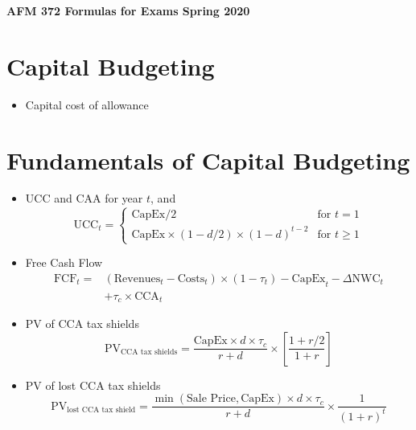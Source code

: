 \documentclass[a4paper,10pt]{extarticle}
\begin{document}
\begin{center}
    \large\bfseries AFM 372 \qquad Formulas for Exams \qquad Spring 2020
\end{center}
\section*{Capital Budgeting}
\begin{itemize}
    \item Capital cost of allowance
\end{itemize}

\section*{Fundamentals of Capital Budgeting}
\begin{itemize}
    \item UCC and CAA for year $t$, and 
    \[\text{UCC}_t=
    \begin{cases}
        \text{CapEx}/2&\text{for $t=1$} \\
        \text{CapEx}\times(1-d/2)\times(1-d)^{t-2}&\text{for $t\geq1$}
    \end{cases}\]
    
    \item Free Cash Flow
    \begin{align*}
        \text{FCF}_t=&(\text{Revenues}_t-\text{Costs}_t)\times(1-\tau_t)-\text{CapEx}_t-\Delta\text{NWC}_t\\&+\tau_c\times\text{CCA}_t
    \end{align*}
    
    \item PV of CCA tax shields
    \[\text{PV}_\text{CCA tax shields} = \dfrac{\text{CapEx}\times d \times \tau_c}{r+d}\times\left[\dfrac{1+r/2}{1+r}\right]\]
    
    \item PV of lost CCA tax shields
    \[\text{PV}_{\text{lost CCA tax shield}}=\dfrac{\min(\text{Sale Price},\text{CapEx})\times d\times \tau_c}{r+d}\times\dfrac{1}{(1+r)^t}\]
\end{itemize}
\end{document}
